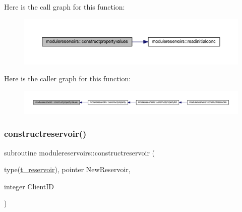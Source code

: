 Here is the call graph for this function\+:\nopagebreak
\begin{figure}[H]
\begin{center}
\leavevmode
\includegraphics[width=350pt]{namespacemodulereservoirs_a45a6c59f07c2eaae456d1a07476b8b6c_cgraph}
\end{center}
\end{figure}
Here is the caller graph for this function\+:\nopagebreak
\begin{figure}[H]
\begin{center}
\leavevmode
\includegraphics[width=350pt]{namespacemodulereservoirs_a45a6c59f07c2eaae456d1a07476b8b6c_icgraph}
\end{center}
\end{figure}
\mbox{\label{namespacemodulereservoirs_adb0f83f2d398504e99ff31c83a07ff2b}} 
\subsubsection{\texorpdfstring{constructreservoir()}{constructreservoir()}}
{\footnotesize\ttfamily subroutine modulereservoirs\+::constructreservoir (\begin{DoxyParamCaption}\item[{type(\mbox{\hyperlink{structmodulereservoirs_1_1t__reservoir}{t\+\_\+reservoir}}), pointer}]{New\+Reservoir,  }\item[{integer}]{Client\+ID }\end{DoxyParamCaption})\hspace{0.3cm}{\ttfamily [private]}}


